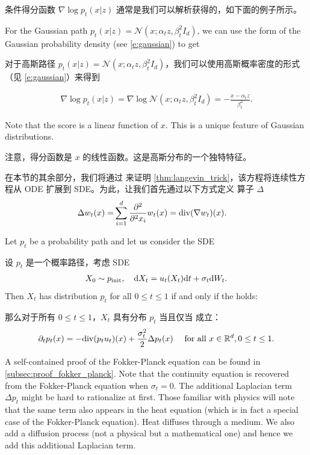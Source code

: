 条件得分函数 $\nabla \log p_t(x|z)$ 通常是我们可以解析获得的，如下面的例子所示。
\begin{examplebox} 
For the Gaussian path $p_t(x|z)=\mathcal{N}(x;\alpha_t z,\beta_t^2 I_d)$, we can use the form of the Gaussian probability density (see \cref{e:gaussian}) to get

对于高斯路径 $p_t(x|z)=\mathcal{N}(x;\alpha_t z,\beta_t^2 I_d)$，我们可以使用高斯概率密度的形式（见 \cref{e:gaussian}）来得到

\begin{align}
\label{eq:cond_score_gaussian}
    \nabla \log p_t(x|z) = \nabla\log \mathcal{N}(x;\alpha_t z,\beta_t^2 I_d) = -\frac{x-\alpha_t z}{\beta_t^2}.
\end{align}

Note that the score is a linear function of $x$. This is a unique feature of Gaussian distributions.

注意，得分函数是 $x$ 的线性函数。这是高斯分布的一个独特特征。
\end{examplebox}

在本节的其余部分，我们将通过  来证明 \cref{thm:langevin_trick}，该方程将连续性方程从 ODE 扩展到 SDE。为此，让我们首先通过以下方式定义  算子 $\Delta$
\begin{align}
    \label{eq:laplacian_definition}
    \Delta w_t(x)=&\sum\limits_{i=1}^{d}\frac{\partial^2}{\partial^2 x_i}w_t(x)=\mathrm{div}(\nabla w_t)(x).
\end{align}
\begin{theorem}
\label{thm:fokker_planck}
Let $p_t$ be a probability path and let us consider the SDE

设 $p_t$ 是一个概率路径，考虑 SDE
\begin{align*}
    X_0\sim p_{\rm{init}}, \quad \mathrm{d} X_t = u_t(X_t)\mathrm{d} t + \sigma_t\mathrm{d} W_t.
\end{align*}
Then $X_t$ has distribution $p_t$ for all $0\leq t\leq 1$ if and only if the  holds:

那么对于所有 $0\leq t\leq 1$，$X_t$ 具有分布 $p_t$ 当且仅当  成立：
    \begin{align}
    \label{e:fokker_planck}
    \partial_t p_t(x) = -\mathrm{div} (p_t u_t)(x)+\frac{\sigma_t^2}{2}\Delta p_t (x)\quad \text{ for all }x\in\mathbb{R}^d, 0\leq t\leq 1.
    \end{align}     
\end{theorem}
A self-contained proof of the Fokker-Planck equation can be found in \cref{subsec:proof_fokker_planck}. Note that the continuity equation is recovered from the Fokker-Planck equation when $\sigma_t=0$. The additional Laplacian term $\Delta p_t$ might be hard to rationalize at first. Those familiar with physics will note that the same term also appears in the heat equation (which is in fact a special case of the Fokker-Planck equation). Heat diffuses through a medium. We also add a diffusion process (not a physical but a mathematical one) and hence we add this additional Laplacian term. 


